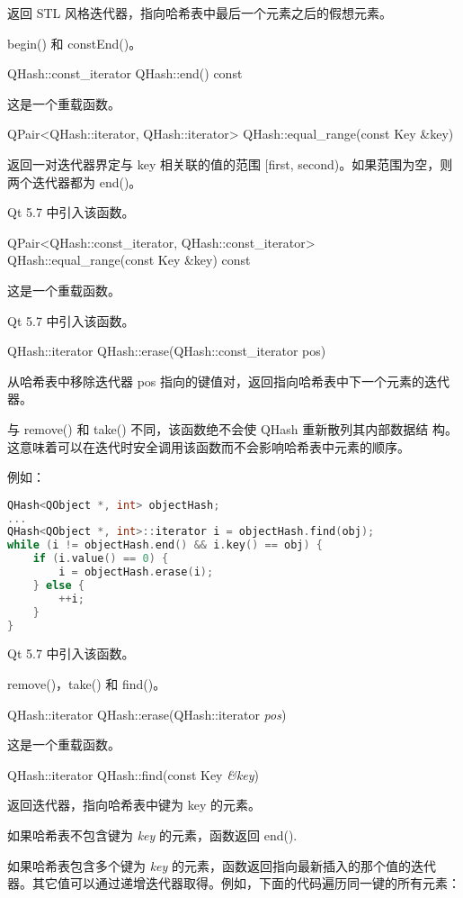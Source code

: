 返回 STL 风格迭代器，指向哈希表中最后一个元素之后的假想元素。

\begin{notice}[另请参阅]
begin() 和 constEnd()。
\end{notice}

QHash::const\_iterator QHash::end() const

这是一个重载函数。

QPair<QHash::iterator, QHash::iterator> QHash::equal\_range(const Key \&key)

返回一对迭代器界定与 key 相关联的值的范围 [first, second)。如果范围为空，则两个迭代器都为 end()。

Qt 5.7 中引入该函数。

QPair<QHash::const\_iterator, QHash::const\_iterator> QHash::equal\_range(const Key \&key) const

这是一个重载函数。

Qt 5.7 中引入该函数。

QHash::iterator QHash::erase(QHash::const\_iterator pos)

从哈希表中移除迭代器 pos 指向的键值对，返回指向哈希表中下一个元素的迭代器。

与 remove() 和 take() 不同，该函数绝不会使 QHash 重新散列其内部数据结
构。这意味着可以在迭代时安全调用该函数而不会影响哈希表中元素的顺序。

例如：

\begin{lstlisting}[language=C++]
QHash<QObject *, int> objectHash;
...
QHash<QObject *, int>::iterator i = objectHash.find(obj);
while (i != objectHash.end() && i.key() == obj) {
    if (i.value() == 0) {
        i = objectHash.erase(i);
    } else {
        ++i;
    }
}
\end{lstlisting}

Qt 5.7 中引入该函数。

\begin{notice}[另请参阅]
remove()，take() 和 find()。
\end{notice}

QHash::iterator QHash::erase(QHash::iterator \emph{pos})

这是一个重载函数。

QHash::iterator QHash::find(const Key \emph{\&key})

返回迭代器，指向哈希表中键为 key 的元素。

如果哈希表不包含键为 \emph{key} 的元素，函数返回 end().

如果哈希表包含多个键为 \emph{key} 的元素，函数返回指向最新插入的那个值的迭代器。其它值可以通过递增迭代器取得。例如，下面的代码遍历同一键的所有元素：


